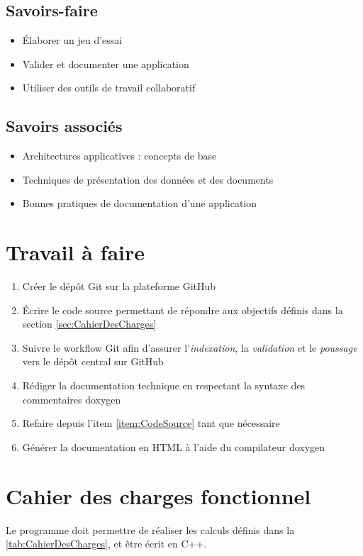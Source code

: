 \documentclass[12pt,a4paper,oneside,titlepage,final]{article}
\begin{document}
\subsection*{Savoirs-faire}
\begin{itemize}
    \item Élaborer un jeu d'essai
    \item Valider et documenter une application
    \item Utiliser des outils de travail collaboratif
\end{itemize}

\subsection*{Savoirs associés}
\begin{itemize}
    \item Architectures applicatives : concepts de base
    \item Techniques de présentation des données et des documents
    \item Bonnes pratiques de documentation d'une application
\end{itemize}

\section{Travail à faire}
\label{sec:TAF}

\begin{enumerate}
    \item Créer le dépôt \gls{Git} sur la plateforme \gls{GitHub}
    \item \label{item:CodeSource} Écrire le code source permettant de
    répondre aux objectifs définis dans la section
    \vref{sec:CahierDesCharges}
    \item Suivre le \gls{workflow} \gls{Git} afin d'assurer
    l'\emph{indexation}, la \emph{validation} et le \emph{poussage}
    vers le dépôt central sur \gls{GitHub}
    \item Rédiger la documentation technique en respectant la syntaxe
    des commentaires \gls{doxygen}\cite{doxygen}
    \item Refaire depuis l'item \vref{item:CodeSource} tant que
    nécessaire
    \item Générer la documentation en HTML à l'aide du compilateur
    \gls{doxygen}
\end{enumerate}

\section{Cahier des charges fonctionnel}
\label{sec:CahierDesCharges}
Le programme doit permettre de réaliser les calculs définis dans la
\tablename \vref{tab:CahierDesCharges}, et être écrit en C++.
\end{document}
